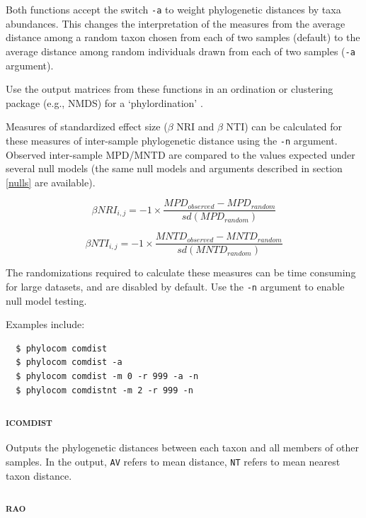 \documentclass[12pt,letterpaper]{article}
\begin{document}
Both functions accept the switch \verb|-a| to weight phylogenetic distances by taxa abundances. This changes the interpretation of the measures from the average distance among a random taxon chosen from each of two samples (default) to the average distance among random individuals drawn from each of two samples (\verb|-a| argument).

Use the output matrices from these functions in an ordination or clustering package
(e.g., NMDS) for a `phylordination' \citep{webb2007phy}.

Measures of standardized effect size ($\beta$ NRI and $\beta$ NTI) can be calculated for these measures of inter-sample phylogenetic distance using the \verb|-n| argument. Observed inter-sample MPD/MNTD are compared to the values expected under several null models (the same null models and arguments described in section \ref{nulls} are available).

\[\beta NRI_{i,j} = -1 \times \frac{ MPD_{observed} - MPD_{random} }{sd(MPD_{random})}\]

\[\beta NTI_{i,j} = -1 \times \frac{ MNTD_{observed} - MNTD_{random} }{sd(MNTD_{random})}\] 

The randomizations required to calculate these measures can be time consuming for large datasets, and are disabled by default. Use the \verb|-n| argument to enable null model testing.

Examples include:
\begin{verbatim}
  $ phylocom comdist
  $ phylocom comdist -a
  $ phylocom comdist -m 0 -r 999 -a -n
  $ phylocom comdistnt -m 2 -r 999 -n
\end{verbatim}

\subsubsection{\scshape icomdist}

Outputs the phylogenetic distances between each taxon and all
members of other samples.  In the output, \verb|AV| refers to mean distance,
\verb|NT| refers to mean nearest taxon distance.

\subsubsection{\scshape rao}
\end{document}

